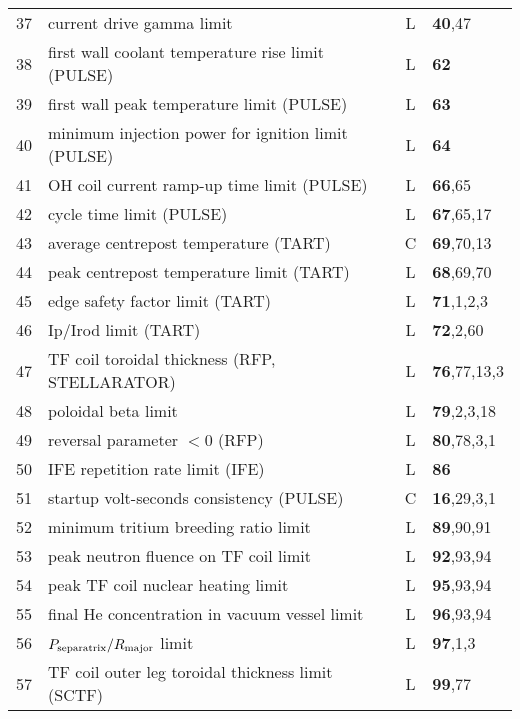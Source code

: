 \documentclass[11pt,a4paper]{report}
\begin{document}
\begin{table}[tbph]
\begin{center}
\begin{tabular}{||c|l|c|l||}
37  & current drive gamma limit                           & L    & \textbf{40},47 \\
38  & first wall coolant temperature rise limit (PULSE)   & L    & \textbf{62} \\
39  & first wall peak temperature limit (PULSE)           & L    & \textbf{63} \\
40  & minimum injection power for ignition limit (PULSE)  & L    & \textbf{64} \\
41  & OH coil current ramp-up time limit (PULSE)          & L    & \textbf{66},65 \\
42  & cycle time limit (PULSE)                            & L    & \textbf{67},65,17 \\
43  & average centrepost temperature (TART)               & C    & \textbf{69},70,13 \\
44  & peak centrepost temperature limit (TART)            & L    & \textbf{68},69,70 \\
45  & edge safety factor limit    (TART)                  & L    & \textbf{71},1,2,3 \\
46  & Ip/Irod limit               (TART)                  & L    & \textbf{72},2,60 \\
47  & TF coil toroidal thickness  (RFP, STELLARATOR)      & L    & \textbf{76},77,13,3 \\
48  & poloidal beta limit                                 & L    & \textbf{79},2,3,18 \\
49  & reversal parameter $< 0$ (RFP)                      & L    & \textbf{80},78,3,1 \\
50  & IFE repetition rate limit (IFE)                     & L    & \textbf{86} \\
51  & startup volt-seconds consistency (PULSE)            & C    & \textbf{16},29,3,1 \\
52  & minimum tritium breeding ratio limit                & L    & \textbf{89},90,91 \\
53  & peak neutron fluence on TF coil limit               & L    & \textbf{92},93,94 \\
54  & peak TF coil nuclear heating limit                  & L    & \textbf{95},93,94 \\
55  & final He concentration in vacuum vessel limit       & L    & \textbf{96},93,94 \\
56  & $P_{\mbox{\scriptsize separatrix}}/R_{\mbox{\scriptsize major}}$ limit & L    & \textbf{97},1,3 \\
57  & TF coil outer leg toroidal thickness limit (SCTF)   & L    & \textbf{99},77 \\

\end{tabular}
\end{center}
\end{table}
\end{document}
